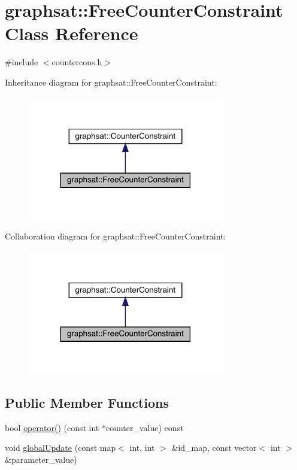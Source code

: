 \hypertarget{classgraphsat_1_1_free_counter_constraint}{}\section{graphsat\+::Free\+Counter\+Constraint Class Reference}
\label{classgraphsat_1_1_free_counter_constraint}


{\ttfamily \#include $<$countercons.\+h$>$}



Inheritance diagram for graphsat\+::Free\+Counter\+Constraint\+:
\nopagebreak
\begin{figure}[H]
\begin{center}
\leavevmode
\includegraphics[width=242pt]{classgraphsat_1_1_free_counter_constraint__inherit__graph}
\end{center}
\end{figure}


Collaboration diagram for graphsat\+::Free\+Counter\+Constraint\+:
\nopagebreak
\begin{figure}[H]
\begin{center}
\leavevmode
\includegraphics[width=242pt]{classgraphsat_1_1_free_counter_constraint__coll__graph}
\end{center}
\end{figure}
\subsection*{Public Member Functions}
\begin{DoxyCompactItemize}
\item 
bool \mbox{\hyperlink{classgraphsat_1_1_free_counter_constraint_a7ba59c5755c2e90b75038ca6373018bb}{operator()}} (const int $\ast$counter\+\_\+value) const
\item 
void \mbox{\hyperlink{classgraphsat_1_1_free_counter_constraint_adb132f25be53be665c6337224c95f15a}{global\+Update}} (const map$<$ int, int $>$ \&id\+\_\+map, const vector$<$ int $>$ \&parameter\+\_\+value)
\end{DoxyCompactItemize}
